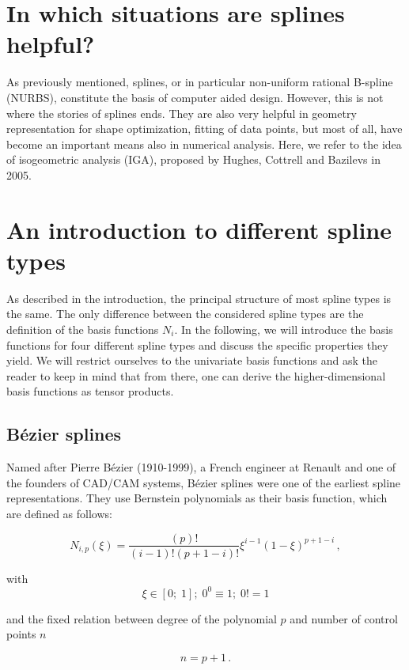 \documentclass[11pt,a4paper]{article}
\begin{document}
\section{In which situations are splines helpful?}

As previously mentioned, splines, or in particular non-uniform rational B-spline (NURBS), constitute the basis of computer aided design. However, this is not where the stories of splines ends. They are also very helpful in geometry representation for shape optimization, fitting of data points, but most of all, have become an important means also in numerical analysis. Here, we refer to the idea of isogeometric analysis (IGA), proposed by Hughes, Cottrell and Bazilevs in 2005. 

\section{An introduction to different spline types}

As described in the introduction, the principal structure of most spline types is the same. The only difference between the considered spline types are the definition of the basis functions $N_i$. In the following, we will introduce the basis functions for four different spline types and discuss the specific properties they yield. We will restrict ourselves to the univariate basis functions and ask the reader to keep in mind that from there, one can derive the higher-dimensional basis functions as tensor products.

\subsection{Bézier splines}

Named after Pierre Bézier (1910-1999), a French engineer at Renault and one of the founders of CAD/CAM systems, Bézier splines were one of the earliest spline representations. They use Bernstein polynomials as their basis function, which are defined as follows:

\begin{equation}
N_{i,p}(\xi)=\frac{(p)!}{(i-1)!(p+1-i)!}\xi^{i-1}(1-\xi)^{p+1-i} \,,
\end{equation}

with
	\[\xi\in[0;\;1];\; 0^{0}\equiv 1;\; 0!=1\]
	
and the fixed relation between degree of the polynomial $p$ and number of control points $n$

	\[n=p+1 \,.\]
	
\end{document}
